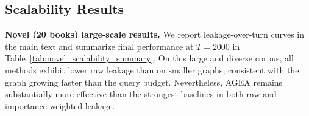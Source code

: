 

\subsection{Scalability Results}
\label{app:scalability}
\noindent\textbf{Novel (20 books) large-scale results.}
We report leakage-over-turn curves in the main text and summarize final performance at $T{=}2000$ in Table~\ref{tab:novel_scalability_summary}.
On this large and diverse corpus, all methods exhibit lower raw leakage than on smaller graphs, consistent with the graph growing faster than the query budget.
Nevertheless, AGEA remains substantially more effective than the strongest baselines in both raw and importance-weighted leakage.

